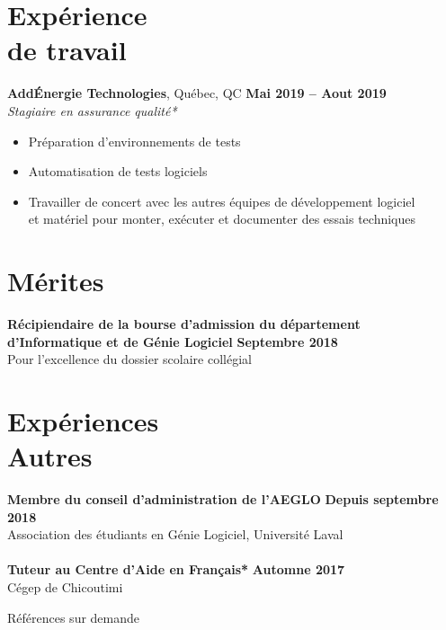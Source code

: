 \documentclass[margin,line]{resume}
\begin{document}
\begin{resume}
    \section{\mysidestyle Expérience\\de travail}
    \textbf{AddÉnergie Technologies}, Québec, QC \hfill \textbf{Mai 2019 -- Aout 2019} \vspace{2mm}\\\vspace{1mm}%
    \textsl{Stagiaire en assurance qualité*}
    \begin{itemize}[nosep]
        \item Préparation d'environnements de tests
        \item Automatisation de tests logiciels
        \item Travailler de concert avec les autres équipes de développement logiciel
        \\    et matériel pour monter, exécuter et documenter des essais techniques
    \end{itemize}

    \section{\mysidestyle Mérites}
     \textbf{Récipiendaire de la bourse d'admission du département
     \\      d'Informatique et de Génie Logiciel} \hfill \textbf{Septembre 2018}
     \vspace{2mm}\\\vspace{1mm}
        Pour l'excellence du dossier scolaire collégial

    \section{\mysidestyle Expériences\\Autres}
     \textbf{Membre du conseil d'administration de l'AEGLO} \hfill \textbf{Depuis septembre 2018} \vspace{2mm}\\\vspace{1mm}
    Association des étudiants en Génie Logiciel, Université Laval \\ \\
   \textbf{Tuteur au Centre d'Aide en Français*} \hfill \textbf{Automne 2017} \vspace{2mm}\\\vspace{1mm}%
    Cégep de Chicoutimi \\


\end{resume}

\name{}
\begin{resume}
\hfill *Références sur demande
\end{resume}
\end{document}
